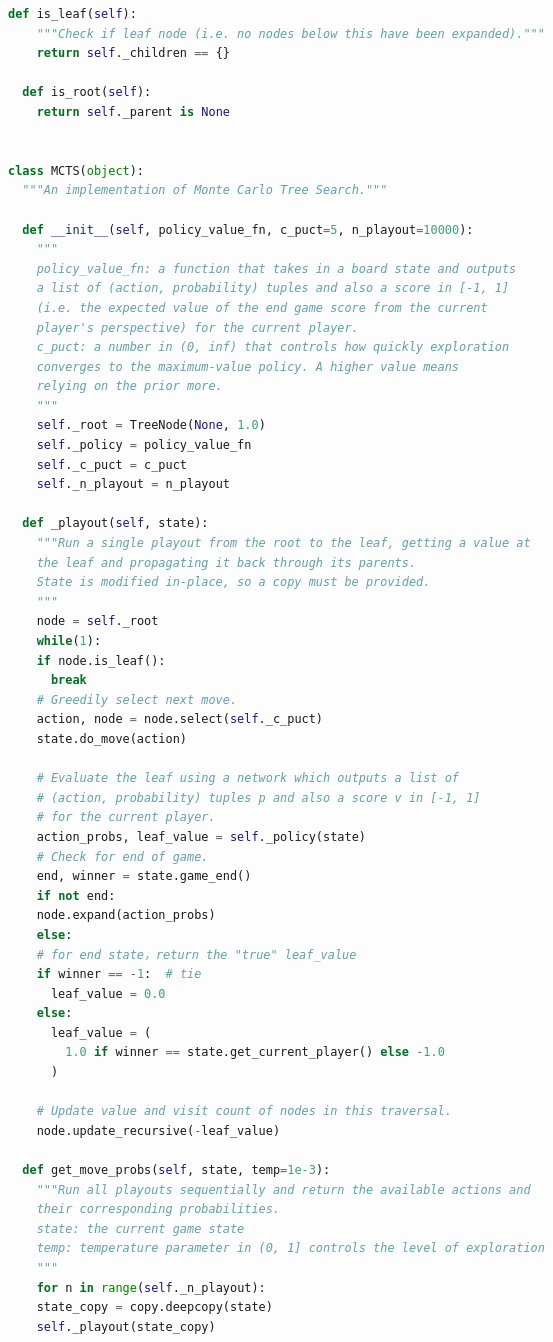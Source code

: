 \documentclass[a4paper]{article}
\begin{document}
\begin{multicols}{2}
\begin{lstlisting}[language=Python,breaklines = true,columns=flexible]
  def is_leaf(self):
    """Check if leaf node (i.e. no nodes below this have been expanded)."""
    return self._children == {}

  def is_root(self):
    return self._parent is None


class MCTS(object):
  """An implementation of Monte Carlo Tree Search."""

  def __init__(self, policy_value_fn, c_puct=5, n_playout=10000):
    """
    policy_value_fn: a function that takes in a board state and outputs
    a list of (action, probability) tuples and also a score in [-1, 1]
    (i.e. the expected value of the end game score from the current
    player's perspective) for the current player.
    c_puct: a number in (0, inf) that controls how quickly exploration
    converges to the maximum-value policy. A higher value means
    relying on the prior more.
    """
    self._root = TreeNode(None, 1.0)
    self._policy = policy_value_fn
    self._c_puct = c_puct
    self._n_playout = n_playout

  def _playout(self, state):
    """Run a single playout from the root to the leaf, getting a value at
    the leaf and propagating it back through its parents.
    State is modified in-place, so a copy must be provided.
    """
    node = self._root
    while(1):
    if node.is_leaf():
      break
    # Greedily select next move.
    action, node = node.select(self._c_puct)
    state.do_move(action)

    # Evaluate the leaf using a network which outputs a list of
    # (action, probability) tuples p and also a score v in [-1, 1]
    # for the current player.
    action_probs, leaf_value = self._policy(state)
    # Check for end of game.
    end, winner = state.game_end()
    if not end:
    node.expand(action_probs)
    else:
    # for end state，return the "true" leaf_value
    if winner == -1:  # tie
      leaf_value = 0.0
    else:
      leaf_value = (
        1.0 if winner == state.get_current_player() else -1.0
      )

    # Update value and visit count of nodes in this traversal.
    node.update_recursive(-leaf_value)

  def get_move_probs(self, state, temp=1e-3):
    """Run all playouts sequentially and return the available actions and
    their corresponding probabilities.
    state: the current game state
    temp: temperature parameter in (0, 1] controls the level of exploration
    """
    for n in range(self._n_playout):
    state_copy = copy.deepcopy(state)
    self._playout(state_copy)


\end{lstlisting}
\end{multicols}
\end{document}
